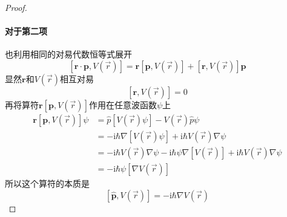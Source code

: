 \begin{proof}
    \paragraph{对于第二项} 也利用相同的对易代数恒等式展开
    $$
        \left[\boldsymbol{r}\cdot\boldsymbol{p}, V(\vec{r})\right]
        = \boldsymbol{r}\left[\boldsymbol{p}, V(\vec{r})\right] + \left[\boldsymbol{r}, V(\vec{r})\right]\boldsymbol{p}
    $$
    显然$\boldsymbol{r}$和$V(\vec{r})$相互对易
    $$
        \left[\boldsymbol{r}, V(\vec{r})\right]=0
    $$
    再将算符$\boldsymbol{r}\left[\boldsymbol{p}, V(\vec{r})\right]$作用在任意波函数$\psi$上
    $$
        \begin{aligned}
            \boldsymbol{r}\left[\boldsymbol{p}, V(\vec{r})\right]\psi
             & =\hat{p}[V(\vec{r})\psi]-V(\vec{r})\hat{p}\psi                                                                      \\
             & = -\mathrm{i}\hbar\nabla[V(\vec r)\psi] + \mathrm{i}\hbar V(\vec r)\nabla\psi                                       \\
             & = -\mathrm{i}\hbar V(\vec r)\nabla\psi - \mathrm{i}\hbar\psi\nabla[V(\vec r)] + \mathrm{i}\hbar V(\vec r)\nabla\psi \\
             & = -\mathrm{i}\hbar\psi[\nabla V(\vec r)]
        \end{aligned}
    $$
    所以这个算符的本质是
    $$
        \left[\hat{\boldsymbol{p}}, V(\vec{r})\right] = -\mathrm{i}\hbar\nabla{V(\vec r)}
    $$
\end{proof}




